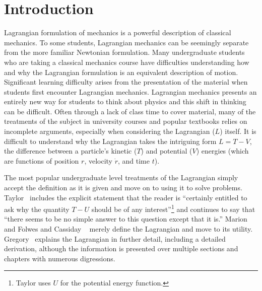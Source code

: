 \documentclass[prb,preprint]{revtex4-1}
\begin{document}
\maketitle



\section{Introduction}\label{introduction}

Lagrangian formulation of mechanics is a powerful description of classical mechanics. To some students, Lagrangian mechanics can be seemingly separate from the more familiar Newtonian formulation. Many undergraduate students who are taking a classical mechanics course have difficulties understanding how and why the Lagrangian formulation is an equivalent description of motion. Significant learning difficulty arises from the presentation of the material when students first encounter Lagrangian mechanics. Lagrangian mechanics presents an entirely new way for students to think about physics and this shift in thinking can be difficult. Often through a lack of class time to cover material, many of the treatments of the subject in university courses and popular textbooks relies on incomplete arguments, especially when considering the Lagrangian ($L$) itself. It is difficult to understand why the Lagrangian takes the intriguing form $L=T-V$, the difference between a particle's kinetic ($T$) and potential ($V$) energies (which are functions of position \boldmath$r$\unboldmath, velocity \boldmath$\dot{r}$\unboldmath, and time $t$). 

The most popular undergraduate level treatments of the Lagrangian simply accept the definition as it is given and move on to using it to solve problems. Taylor~\cite[p.~238]{taylor2005classical} includes the explicit statement that the reader is ``certainly entitled to ask why the quantity $T-U$ should be of any interest''\footnote{Taylor uses $U$ for the potential energy function.} and continues to say that ``there seems to be no simple answer to this question except that it is.'' Marion ~\cite[p.~198-199]{marion1970classical} and Folwes and Cassiday ~\cite[p.~393]{fowles1999analytical} merely define the Lagrangian and move to its utility. Gregory~\cite[p.~348]{gregory2006classical} explains the Lagrangian in further detail, including a detailed derivation, although the information is presented over multiple sections and chapters with numerous digressions.
\end{document}
